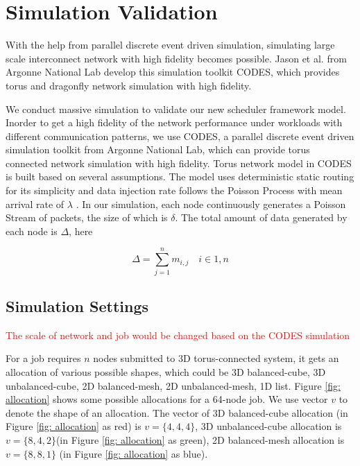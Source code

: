 \documentclass[conference]{IEEEtran}
\begin{document}
\section{Simulation Validation}
\label{sec:simulation validation}

With the help from parallel discrete event driven simulation, simulating large scale interconnect network with high fidelity becomes possible\cite{ross}. Jason et al. from Argonne National Lab develop this simulation toolkit CODES, which provides torus and dragonfly network simulation with high fidelity\cite{Jason-2011}\cite{mubarak-sc2012}.

We conduct massive simulation to validate our new scheduler framework model. Inorder to get a high fidelity of the network performance under workloads with different communication patterns, we use CODES, a parallel discrete event driven simulation toolkit from Argonne National Lab, which can provide torus connected network simulation with high fidelity\cite{Jason-2011}. Torus network model in CODES is built based on several assumptions. The model uses deterministic static routing for its simplicity and data injection rate follows the Poisson Process with mean arrival rate of $\lambda$ \cite{Jason-2011}. In our simulation, each node continuously generates a Poisson Stream of packets, the size of which is $\delta$. The total amount of data generated by each node is $\Delta$, here

\begin{equation}
\Delta = \sum_{j=1}^{n} m_{i, j} \quad i \in {1,n}
\end{equation}

\subsection{Simulation Settings}
\label{sec:simulation settings}
\textcolor{red}{The scale of network and job would be changed based on the CODES simulation}

For a job requires $n$ nodes submitted to 3D torus-connected system, it gets an allocation of various possible shapes, which could be 3D balanced-cube, 3D unbalanced-cube, 2D balanced-mesh, 2D unbalanced-mesh, 1D list. Figure \ref{fig: allocation} shows some possible allocations for a 64-node job. We use vector $v$ to denote the shape of an allocation. The vector of 3D balanced-cube allocation (in Figure \ref{fig: allocation} as red) is $v=\{4,4,4\}$, 3D unbalanced-cube allocation is $v=\{8,4,2\}$(in Figure \ref{fig: allocation} as green), 2D balanced-mesh allocation is $v=\{8,8,1\}$ (in Figure \ref{fig: allocation} as blue).
\end{document}
